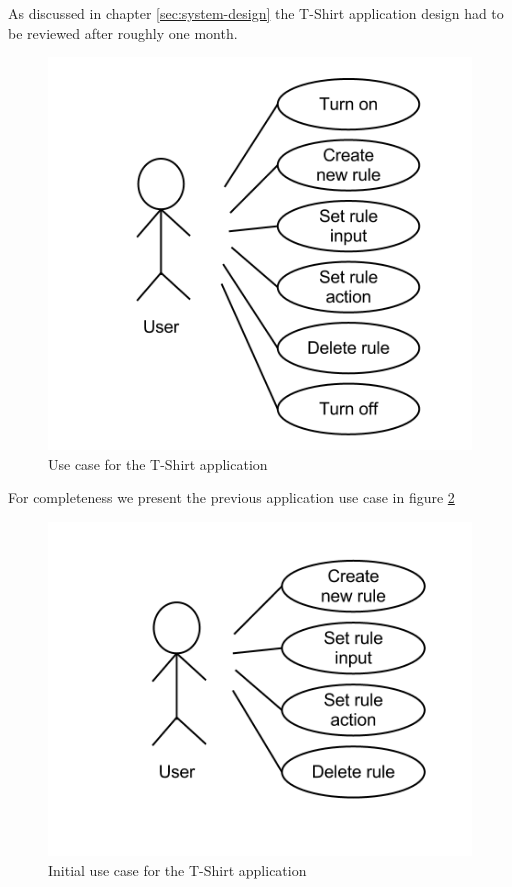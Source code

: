 As discussed in chapter \ref{sec:system-design} the T-Shirt application design had to be reviewed after roughly one month.

\begin{figure}[h!]
	\centering \includegraphics[scale=0.35]{img/design-tshirtappusecase2}
	\caption{Use case for the T-Shirt application}
	\label{fig:design-tshirtappusecase2}
\end{figure}

For completeness we present the previous application use case in figure \ref{fig:design-tshirtappusecase1}

\begin{figure}[h!]
	\centering \includegraphics[scale=0.35]{img/design-tshirtappusecase1}
	\caption{Initial use case for the T-Shirt application}
	\label{fig:design-tshirtappusecase1}
\end{figure}

